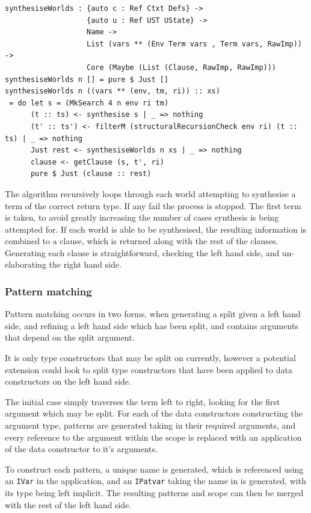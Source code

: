 \documentclass[a4paper]{article}
\begin{document}
\begin{center}
  \begin{verbatim}
synthesiseWorlds : {auto c : Ref Ctxt Defs} -> 
                   {auto u : Ref UST UState} -> 
                   Name ->
                   List (vars ** (Env Term vars , Term vars, RawImp)) ->
                   Core (Maybe (List (Clause, RawImp, RawImp)))
synthesiseWorlds n [] = pure $ Just []
synthesiseWorlds n ((vars ** (env, tm, ri)) :: xs)
 = do let s = (MkSearch 4 n env ri tm)
      (t :: ts) <- synthesise s | _ => nothing  
      (t' :: ts') <- filterM (structuralRecursionCheck env ri) (t :: ts) | _ => nothing
      Just rest <- synthesiseWorlds n xs | _ => nothing
      clause <- getClause (s, t', ri)
      pure $ Just (clause :: rest)
  \end{verbatim}
\end{center}

The algorithm recursively loops through each world attempting to synthesise a term of
the correct return type. If any fail the process is stopped. The first term is taken,
to avoid greatly increasing the number of cases synthesis is being attempted for. If
each world is able to be synthesised, the resulting information is combined to a
clause, which is returned along with the rest of the clauses. Generating each clause
is straightforward, checking the left hand side, and un-elaborating the right hand side.

\subsubsection{Pattern matching}

Pattern matching occurs in two forms, when generating a split given a
left hand side, and refining a left hand side which has been split,
and contains arguments that depend on the split argument.

It is only type constructors that may be split on currently,
however a potential extension could look to split type constructors
that have been applied to data constructors on the left hand side.

The initial case simply traverses the term left to right,
looking for the first argument which may be split.
For each of the data constructors constructing the argument type,
patterns are generated taking in their required arguments, and
every reference to the argument within the scope is replaced with an
application of the data constructor to it's arguments.

To construct each pattern, a unique name is generated, which is
referenced using an \texttt{IVar} in the application, and an
\texttt{IPatvar} taking the name in is generated, with its type being
left implicit. The resulting patterns and scope can then be merged
with the rest of the left hand side. 
\end{document}
